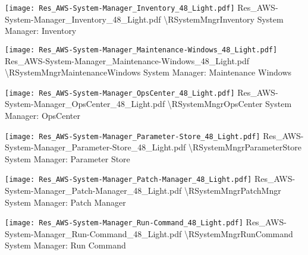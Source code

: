  {\texttt{[image: Res\_AWS-System-Manager\_Inventory\_48\_Light.pdf]}} {Res\_AWS-System-Manager\_Inventory\_48\_Light.pdf} {{\textbackslash}RSystemMngrInventory} {System Manager: Inventory}

 {\texttt{[image: Res\_AWS-System-Manager\_Maintenance-Windows\_48\_Light.pdf]}} {Res\_AWS-System-Manager\_Maintenance-Windows\_48\_Light.pdf} {{\textbackslash}RSystemMngrMaintenanceWindows} {System Manager: Maintenance Windows}

 {\texttt{[image: Res\_AWS-System-Manager\_OpsCenter\_48\_Light.pdf]}} {Res\_AWS-System-Manager\_OpsCenter\_48\_Light.pdf} {{\textbackslash}RSystemMngrOpsCenter} {System Manager: OpsCenter}

 {\texttt{[image: Res\_AWS-System-Manager\_Parameter-Store\_48\_Light.pdf]}} {Res\_AWS-System-Manager\_Parameter-Store\_48\_Light.pdf} {{\textbackslash}RSystemMngrParameterStore} {System Manager: Parameter Store}

 {\texttt{[image: Res\_AWS-System-Manager\_Patch-Manager\_48\_Light.pdf]}} {Res\_AWS-System-Manager\_Patch-Manager\_48\_Light.pdf} {{\textbackslash}RSystemMngrPatchMngr} {System Manager: Patch Manager}

 {\texttt{[image: Res\_AWS-System-Manager\_Run-Command\_48\_Light.pdf]}} {Res\_AWS-System-Manager\_Run-Command\_48\_Light.pdf} {{\textbackslash}RSystemMngrRunCommand} {System Manager: Run Command}

